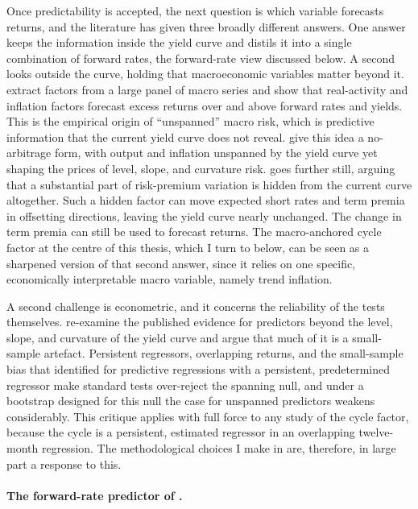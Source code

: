 Once predictability is accepted, the next question is which variable
forecasts returns, and the literature has given three broadly different
answers. One answer keeps the information inside the yield curve and distils
it into a single combination of forward rates, the forward-rate view
discussed below. A second looks outside the curve, holding that macroeconomic
variables matter beyond it. \citet{ludvigson2009} extract factors
from a large panel of macro series and show that real-activity and
inflation factors forecast excess returns over and above forward rates and
yields. This is the empirical origin of ``unspanned'' macro risk, which is
predictive information that the current yield curve does not reveal.
\citet{joslin2014} give this idea a no-arbitrage form, with output and
inflation unspanned by the yield curve yet shaping the prices of level,
slope, and curvature risk. \citet{duffee2011} goes further still, arguing that a
substantial part of risk-premium variation is hidden from the current
curve altogether. Such a hidden factor can move expected short rates and term
premia in offsetting directions, leaving the yield curve nearly unchanged.
The change in term premia can still be used to forecast returns. The macro-anchored cycle factor at the centre
of this thesis, which I turn to below, can be seen as a sharpened version
of that second answer, since it relies on one specific, economically
interpretable macro variable, namely trend inflation.

A second challenge is econometric, and it concerns the reliability of the
tests themselves. \citet{bauerhamilton2018} re-examine the published evidence for
predictors beyond the level, slope, and curvature of the yield curve and
argue that much of it is a small-sample artefact. Persistent regressors,
overlapping returns, and the small-sample bias that \citet{stambaugh1999}
identified for predictive regressions with a persistent, predetermined
regressor make standard tests over-reject the spanning null,
and under a bootstrap designed for this null the case for unspanned
predictors weakens considerably. This critique applies with full force to
any study of the cycle factor, because the cycle is a persistent,
estimated regressor in an overlapping twelve-month regression. The
methodological choices I make in  are, therefore,
in large part a response to this.

\paragraph{The forward-rate predictor of \citet{cochrane2005}.}
\label{sec:lit-cp2005}

